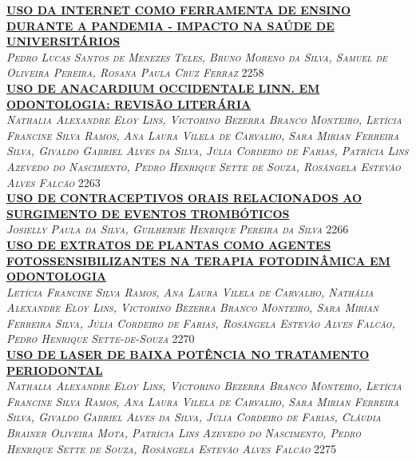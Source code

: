 \noindent \textsc{\hyperlink{trabalhos/251278.pdf.1}{\textbf{USO DA INTERNET COMO FERRAMENTA DE ENSINO DURANTE A PANDEMIA - IMPACTO NA SAÚDE DE UNIVERSITÁRIOS}}}\\ 
\noindent \textsc{\textit{Pedro Lucas Santos de Menezes Teles, Bruno Moreno da Silva, Samuel de Oliveira Pereira, Rosana Paula Cruz Ferraz}} \hfill 2258\\ 

\noindent \textsc{\hyperlink{trabalhos/250847.pdf.1}{\textbf{USO DE ANACARDIUM OCCIDENTALE LINN. EM ODONTOLOGIA: REVISÃO LITERÁRIA }}}\\ 
\noindent \textsc{\textit{Nathalia Alexandre Eloy Lins, Victorino Bezerra Branco Monteiro, Letícia Francine Silva Ramos, Ana Laura Vilela de Carvalho, Sara Mirian Ferreira Silva, Givaldo Gabriel Alves da Silva, Júlia Cordeiro de Farias, Patrícia Lins Azevedo do Nascimento, Pedro Henrique Sette de Souza, Rosângela Estevão Alves Falcão}} \hfill 2263\\ 

\noindent \textsc{\hyperlink{trabalhos/249270.pdf.1}{\textbf{USO DE CONTRACEPTIVOS ORAIS RELACIONADOS AO SURGIMENTO DE EVENTOS TROMBÓTICOS }}}\\ 
\noindent \textsc{\textit{Josielly Paula da Silva, Guilherme Henrique Pereira da Silva}} \hfill 2266\\ 

\noindent \textsc{\hyperlink{trabalhos/251214.pdf.1}{\textbf{USO DE EXTRATOS DE PLANTAS COMO AGENTES FOTOSSENSIBILIZANTES NA TERAPIA FOTODINÂMICA EM ODONTOLOGIA}}}\\ 
\noindent \textsc{\textit{Letícia Francine Silva Ramos, Ana Laura Vilela de Carvalho, Nathália Alexandre Eloy Lins, Victorino Bezerra Branco Monteiro, Sara Mirian Ferreira Silva, Júlia Cordeiro de Farias, Rosângela Estevão Alves Falcão, Pedro Henrique Sette-de-Souza}} \hfill 2270\\ 

\noindent \textsc{\hyperlink{trabalhos/251314.pdf.1}{\textbf{USO DE LASER DE BAIXA POTÊNCIA NO TRATAMENTO PERIODONTAL}}}\\ 
\noindent \textsc{\textit{Nathalia Alexandre Eloy Lins, Victorino Bezerra Branco Monteiro, Letícia Francine Silva Ramos, Ana Laura Vilela de Carvalho, Sara Mirian Ferreira Silva, Givaldo Gabriel Alves da Silva, Júlia Cordeiro de Farias, Cláudia Brainer Oliveira Mota, Patrícia Lins Azevedo do Nascimento, Pedro Henrique Sette de Souza, Rosângela Estevão Alves Falcão}} \hfill 2275\\ 

